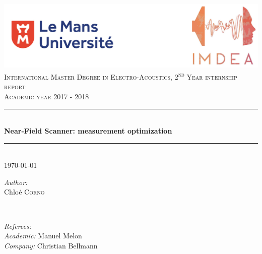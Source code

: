 \documentclass{report}
\newcommand{\ts}{\textsuperscript} 	%
\begin{document}

\begin{titlepage}

\newcommand{\HRule}{\rule{\linewidth}{0.5mm}} %

\center %

\includegraphics[scale=0.4]{logo.png} \\[3cm] %


\textsc{\large International Master Degree in Electro-Acoustics, 2\ts{nd} Year internship report}\\[0.4cm] %
\textsc{\normalsize Academic year 2017 - 2018}\\[0.7cm] %


\HRule \\[0.4cm]
 { \huge \bfseries Near-Field Scanner: measurement optimization}\\[0.3cm] 
\HRule \\[1.5cm]

    
{\large \today}\\[2cm] 


\begin{minipage}{0.4\textwidth}
\begin{flushleft} \large
\emph{Author:}\\ %
Chlo\'{e} \textsc{Corno}

\end{flushleft}
\end{minipage}
~
\begin{minipage}{0.4\textwidth}
\begin{flushright} \large
\emph{Referees:} \\ %
\textit{Academic:} Manuel Melon \\
\textit{Company:} Christian Bellmann \\


\end{flushright}
\end{minipage}\\[2cm]
 
\vfill %

\end{titlepage}
\end{document}
